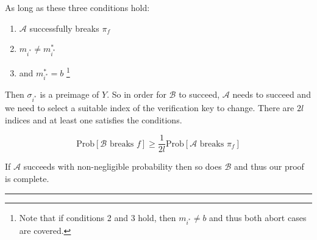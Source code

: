\documentclass[twoside]{article}
\newenvironment{proof}{{\bf Proof:}}{\hfill\rule{2mm}{2mm}}
\begin{document}
\begin{proof}
As long as these three conditions hold:
\begin{enumerate}
\item $\mathcal{A}$ successfully breaks $\pi_f$
\item $m_{i^*} \neq m^*_{i^*}$
\item and $m^*_{i^*} = b$ \footnote{Note that if conditions 2 and 3 hold, then $m_{i^*} \neq b$ and thus both abort cases are covered.}
\end{enumerate}

Then $\sigma_{i^*}$ is a preimage of $Y$. So in order for $\mathcal{B}$ to succeed, $\mathcal{A}$ needs to succeed and we need to select a suitable index of the verification key to change. There are $2l$ indices and at least one satisfies the conditions.

$$\text{Prob}[\mathcal{B}\text{ breaks }f] \geq \frac{1}{2l}\text{Prob}[\mathcal{A}\text{ breaks }\pi_f]$$

If $\mathcal{A}$ succeeds with non-negligible probability then so does $\mathcal{B}$ and thus our proof is complete.
\end{proof}
\end{document}
